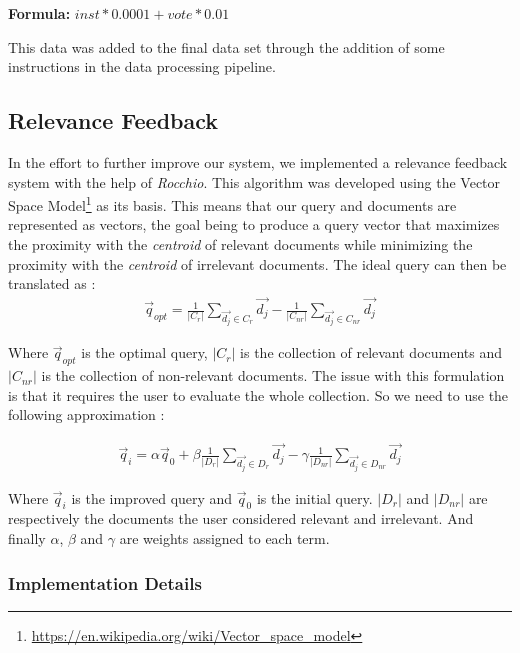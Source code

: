 \textbf{Formula:} $inst*0.0001 + vote*0.01$

This data was added to the final data set through the addition of some instructions in the data processing pipeline.

\subsection{Relevance Feedback}

In the effort to further improve our system, we implemented a relevance feedback system with the help of \emph{Rocchio}. This algorithm was developed using the Vector Space Model\footnote{\url{https://en.wikipedia.org/wiki/Vector_space_model}} as its basis. This means that our query and documents are represented as vectors, the goal being to produce a query vector that maximizes the proximity with the \emph{centroid} of relevant documents while minimizing the proximity with the \emph{centroid} of irrelevant documents. 
The ideal query can then be translated as \cite{rocchioformulations}:
\begin{align}
    \overrightarrow{q}_{opt} = \frac{1}{|C_r|} \sum_{\overrightarrow{d_j} \in C_r} \overrightarrow{d_j} - \frac{1}{|C_{nr}|} \sum_{\overrightarrow{d_j} \in C_{nr}} \overrightarrow{d_j}
\end{align}

Where $\overrightarrow{q}_{opt}$ is the optimal query, $|C_r|$ is the collection of relevant documents and $|C_{nr}|$ is the collection of non-relevant documents. The issue with this formulation is that it requires the user to evaluate the whole collection. So we need to use the following approximation \cite{rocchioformulations}: 

\begin{align}
    \overrightarrow{q}_i = \alpha \overrightarrow{q}_0 + \beta \frac{1}{|D_r|} \sum_{\overrightarrow{d_j} \in D_r} \overrightarrow{d_j} - \gamma \frac{1}{|D_{nr}|} \sum_{\overrightarrow{d_j} \in D_{nr}} \overrightarrow{d_j}
\end{align}

Where $\overrightarrow{q}_i$ is the improved query and $\overrightarrow{q}_0$ is the initial query. $|D_r|$ and $|D_{nr}|$ are respectively the documents the user considered relevant and irrelevant. And finally $\alpha$, $\beta$ and $\gamma$ are weights assigned to each term. \cite{rocchioformulations}

\subsubsection{Implementation Details}


